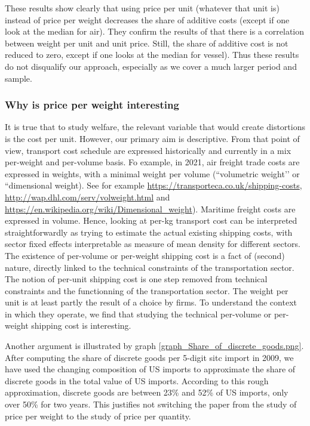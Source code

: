 \documentclass[a4paper,11pt]{article}
\begin{document}
These results show clearly that using price per unit (whatever that unit is) instead of price per weight decreases the share of additive costs (except if one look at the median for air).
They confirm the results of \citet{Lashkaripour_JIE2020} that there is a correlation between weight per unit and unit price.
Still, the share of additive cost is not reduced to zero, except if one looks at the median for vessel).
Thus these results do not disqualify our approach, especially as we cover a much larger period and sample.

\subsubsection{Why is price per weight interesting}
It is true that to study welfare, the relevant variable that would create distortions is the cost per unit. 
However, our primary aim is descriptive. 
From that point of view, transport cost schedule are expressed historically and currently in a mix per-weight and per-volume basis. 
Fo example, in 2021, air freight trade costs are expressed in weights, with a minimal weight per volume (``volumetric weight’’ or ``dimensional weight). See for example \href{https://transporteca.co.uk/shipping-costs}{https://transporteca.co.uk/shipping-costs}, \href{http://wap.dhl.com/serv/volweight.html}{http://wap.dhl.com/serv/volweight.html} and \href{https://en.wikipedia.org/wiki/Dimensional_weight}{ https://en.wikipedia.org/wiki/Dimensional\_weight}).
Maritime freight costs are expressed in volume.
Hence, looking at per-kg transport cost can be interpreted straightforwardly as trying to estimate the actual existing shipping costs, with sector fixed effects interpretable as measure of mean density for different sectors.
The existence of per-volume or per-weight shipping cost is a fact of (second) nature, directly linked to the technical constraints of the transportation sector.
The notion of per-unit shipping cost is one step removed from technical constraints and the functionning of the transportation sector.
The weight per unit is at least partly the result of a choice by firms. 
To understand the context in which they operate, we find that studying the technical per-volume or per-weight shipping cost is interesting.

Another argument is illustrated by graph \ref{graph_Share_of_discrete_goods.png}.
After computing the share of discrete goods per 5-digit sitc import in 2009, we have used the changing composition of US imports to approximate the share of discrete goods in the total value of US imports.
According to this rough approximation, discrete goods are between 23\% and 52\% of US imports, only over 50\% for two years.
This justifies not switching the paper from the study of price per weight to the study of price per quantity.
\end{document}
